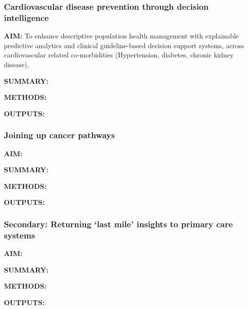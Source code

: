 \documentclass[
  letterpaper,
  DIV=11,
  numbers=noendperiod]{scrartcl}
\begin{document}
\subsubsection{Cardiovascular disease prevention through decision
intelligence}\label{cardiovascular-disease-prevention-through-decision-intelligence}

\textbf{AIM:} To enhance descriptive population health management with
explainable predictive analytics and clinical guideline-based decision
support systems, across cardiovascular related co-morbidities
(Hypertension, diabetes, chronic kidney disease).

\textbf{SUMMARY:}

\textbf{METHODS:}

\textbf{OUTPUTS:}

\subsubsection{Joining up cancer
pathways}\label{joining-up-cancer-pathways}

\textbf{AIM:}

\textbf{SUMMARY:}

\textbf{METHODS:}

\textbf{OUTPUTS:}

\subsubsection{Secondary: Returning `last mile' insights to primary care
systems}\label{secondary-returning-last-mile-insights-to-primary-care-systems}

\textbf{AIM:}

\textbf{SUMMARY:}

\textbf{METHODS:}

\textbf{OUTPUTS:}
\end{document}
